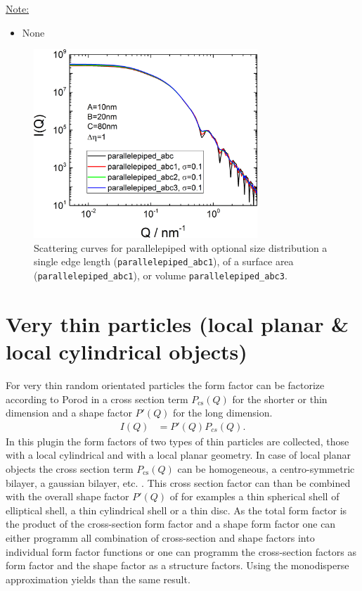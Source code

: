 \noindent\underline{Note:}
\begin{itemize}
\item None
\end{itemize}

\begin{figure}[htb]
\begin{center}
\includegraphics[width=0.75\textwidth]{../images/form_factor/anisotropic/parallelepipedABC.png}
\end{center}
\caption{Scattering curves for parallelepiped with optional size distribution a single edge length (\texttt{parallelepiped\_abc1}), of a surface area (\texttt{parallelepiped\_abc1}), or volume \texttt{parallelepiped\_abc3}.}
\label{fig:IQparallelepiped}
\end{figure}

\clearpage
\section{Very thin particles (local planar \& local cylindrical objects)}
\label{sec:very_anisotropic_particles}
For very thin random orientated particles the form factor
can be factorize according to Porod \cite{Porod1948} in a cross
section term $P_\text{cs}(Q)$ for the shorter or thin dimension and a
shape factor $P'(Q)$ for the long dimension.
\begin{align}
\label{eq:PprimePcs}
I(Q) &=P'(Q) P_{cs}(Q).
\end{align}
In this plugin the form factors of two types of thin
particles are collected, those with a local cylindrical and with a
local planar geometry. In case of local planar objects the cross
section term $P_\text{cs}(Q)$ can be homogeneous, a
centro-symmetric bilayer, a gaussian bilayer, etc. . This cross
section factor can than be combined with the overall shape factor
$P'(Q)$ of for examples a thin spherical shell of elliptical
shell, a thin cylindrical shell or a thin disc. As the total form
factor is the product of the cross-section form factor and a shape
form factor one can either programm all combination of
cross-section and shape factors into individual form factor
functions or one can programm the cross-section factors as form
factor and the shape factor as a structure factors. Using the
monodisperse approximation yields than the same result.

